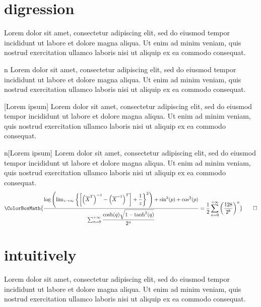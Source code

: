 \newpage

\section{digression}

\begin{digression}{}
	Lorem dolor sit amet, consectetur adipiscing elit, sed do eiusmod tempor incididunt ut labore et dolore magna aliqua. Ut enim ad minim veniam, quis nostrud exercitation ullamco laboris nisi ut aliquip ex ea commodo consequat.
\end{digression}

\begin{digression}{n}
	Lorem dolor sit amet, consectetur adipiscing elit, sed do eiusmod tempor incididunt ut labore et dolore magna aliqua. Ut enim ad minim veniam, quis nostrud exercitation ullamco laboris nisi ut aliquip ex ea commodo consequat.
\end{digression}

\begin{digression}{}[Lorem ipsum]
	Lorem dolor sit amet, consectetur adipiscing elit, sed do eiusmod tempor incididunt ut labore et dolore magna aliqua. Ut enim ad minim veniam, quis nostrud exercitation ullamco laboris nisi ut aliquip ex ea commodo consequat.
\end{digression}

\begin{digression}{n}[Lorem ipsum]
	Lorem dolor sit amet, consectetur adipiscing elit, sed do eiusmod tempor incididunt ut labore et dolore magna aliqua. Ut enim ad minim veniam, quis nostrud exercitation ullamco laboris nisi ut aliquip ex ea commodo consequat.
	\begin{equation*}
		\ColorBoxMath{\dfrac{\log\left(\lim_{z\to\infty}\left\{\left[\left(\overline{X}^{T}\right)^{-1}-\left(\overline{X}^{-1}\right)^T\right]+\dfrac{1}{z}\right\}^2\right)+\sin^2(p)+\cos^2(p)}{\sum_{n=0}^{+\infty}\dfrac{\cosh(q)\sqrt{1-\tanh^2(q)}}{2^n}}=\dfrac{1}{2}\sum_{n=0}^{+\infty}\left(\dfrac{128}{2^8}\right)^n}\qedhere
	\end{equation*}
\end{digression}

\newpage

\section{intuitively}

\begin{intuitively}{}
	Lorem dolor sit amet, consectetur adipiscing elit, sed do eiusmod tempor incididunt ut labore et dolore magna aliqua. Ut enim ad minim veniam, quis nostrud exercitation ullamco laboris nisi ut aliquip ex ea commodo consequat.
\end{intuitively}

